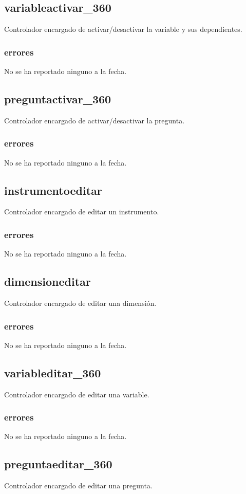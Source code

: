 \documentclass[10pt,a4paper]{book}
\begin{document}
	\subsection{variableactivar\_360}
	Controlador encargado de activar/desactivar la variable y sus dependientes.
	\subsubsection{errores}
	No se ha reportado ninguno a la fecha.
	
	\subsection{preguntactivar\_360}
	Controlador encargado de activar/desactivar la pregunta.
	\subsubsection{errores}
	No se ha reportado ninguno a la fecha.
	
	\subsection{instrumentoeditar}
	Controlador encargado de editar un instrumento.
	\subsubsection{errores}
	No se ha reportado ninguno a la fecha.
	
	\subsection{dimensioneditar}
	Controlador encargado de editar una dimensión.
	\subsubsection{errores}
	No se ha reportado ninguno a la fecha.
	
	\subsection{variableditar\_360}
	Controlador encargado de editar una variable.
	\subsubsection{errores}
	No se ha reportado ninguno a la fecha.
	
	\subsection{preguntaeditar\_360}
	Controlador encargado de editar una pregunta.
\end{document}
